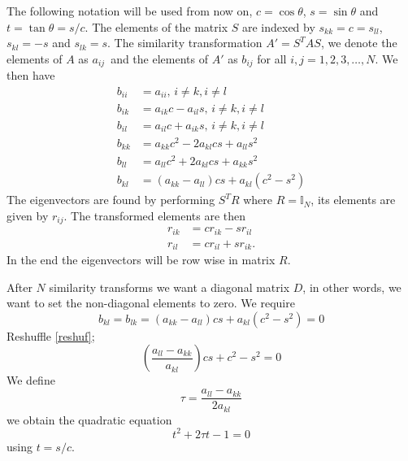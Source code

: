\documentclass[%
reprint,
nofootinbib,
amsmath,amssymb,
aps,
]{revtex4-1}
\begin{document}
The following notation will be used from now on, $c = \cos\theta$, $s = \sin\theta$ and $t = \tan\theta = s/c$. 
The elements of the matrix $S$ are indexed by $s_{kk} = c = s_{ll}$, $s_{kl} = -s$ and $s_{lk} = s$. The similarity transformation $A' = S^TAS$, we denote the elements of $A$ as $a_{ij}$ and the elements of $A'$ as $b_{ij}$ for all $i,j = 1,2,3,\dots, N$. We then have \cite{mortenJM}
\begin{equation}\label{rotation}
	\begin{split}
		b_{ii} &= a_{ii}, \, i\neq k, i\neq l\\
		b_{ik} &= a_{ik}c - a_{il}s, \, i\neq k, i\neq l\\
		b_{il} &= a_{il}c + a_{ik}s, \, i\neq k, i\neq l\\
		b_{kk} &= a_{kk}c^2 - 2a_{kl}cs + a_{ll} s^2\\
		b_{ll} &= a_{ll}c^2 + 2a_{kl} cs + a_{kk} s^2\\
		b_{kl} &= (a_{kk} - a_{ll})cs + a_{kl}(c^2-s^2)
	\end{split}
\end{equation}
The eigenvectors are found by performing $S^TR$ where $R = \mathbb{I}_N$, its elements are given by $r_{ij}$. The transformed elements are then 
\begin{equation}
	\begin{split}
	r_{ik} &= cr_{ik} - sr_{il}\\
	r_{il} &= cr_{il} + s r_{ik}.
	\end{split}
\end{equation}
In the end the eigenvectors will be row wise in matrix $R$. 

After $N$ similarity transforms we want a diagonal matrix $D$, in other words, we want to set the non-diagonal elements to zero. We require 
\begin{equation}\label{reshuf}
	b_{kl} = b_{lk}=(a_{kk} - a_{ll})cs + a_{kl}(c^2-s^2) = 0 
\end{equation}
Reshuffle \ref{reshuf};
\begin{equation}
	\left(\frac{a_{ll} - a_{kk}}{a_{kl}}\right)cs + c^2-s^2 = 0
\end{equation}
We define 
\begin{equation}
	\tau = \frac{a_{ll} - a_{kk}}{2a_{kl}}
\end{equation}
we obtain the quadratic equation 
\begin{equation}
	t^2 + 2\tau t - 1 = 0
\end{equation}
using $t = s/c$. 
\end{document}
